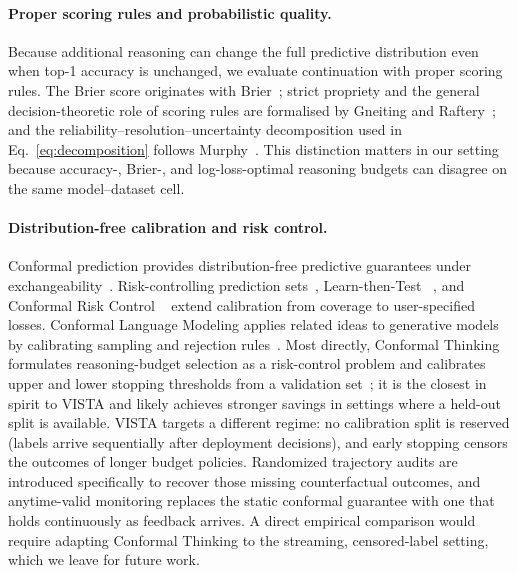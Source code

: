 \documentclass[a4paper,fleqn]{cas-sc}
\theoremstyle{plain}
\theoremstyle{definition}
\theoremstyle{remark}
\begin{document}
\paragraph{Proper scoring rules and probabilistic quality.}
Because additional reasoning can change the full predictive distribution even
when top-1 accuracy is unchanged, we evaluate continuation with proper scoring
rules. The Brier score originates with Brier~\cite{brier1950verification};
strict propriety and the general decision-theoretic role of scoring rules are
formalised by Gneiting and Raftery~\cite{gneiting2007strictly}; and the
reliability--resolution--uncertainty decomposition used in
Eq.~\eqref{eq:decomposition} follows Murphy~\cite{murphy1973new}.
This distinction matters in our setting because accuracy-, Brier-, and
log-loss-optimal reasoning budgets can disagree on the same model--dataset cell.

\paragraph{Distribution-free calibration and risk control.}
Conformal prediction provides distribution-free predictive guarantees under
exchangeability~\cite{vovk2005algorithmic,lei2018conformal}. Risk-controlling
prediction sets~\cite{bates2021rcps}, Learn-then-Test
~\cite{angelopoulos2025ltt}, and Conformal Risk Control
~\cite{angelopoulos2024crc} extend calibration from coverage to user-specified
losses. Conformal Language Modeling applies related ideas to generative models
by calibrating sampling and rejection rules~\cite{quach2024conformal}.
Most directly, Conformal Thinking formulates reasoning-budget selection as a
risk-control problem and calibrates upper and lower stopping thresholds from a
validation set~\cite{wang2026conformalthinking}; it is the closest in spirit to
VISTA and likely achieves stronger savings in settings where a held-out split is
available.
VISTA targets a different regime: no calibration split is reserved (labels
arrive sequentially after deployment decisions), and early stopping censors the
outcomes of longer budget policies.
Randomized trajectory audits are introduced specifically to recover those
missing counterfactual outcomes, and anytime-valid monitoring replaces the
static conformal guarantee with one that holds continuously as feedback arrives.
A direct empirical comparison would require adapting Conformal Thinking to
the streaming, censored-label setting, which we leave for future work.
\end{document}
